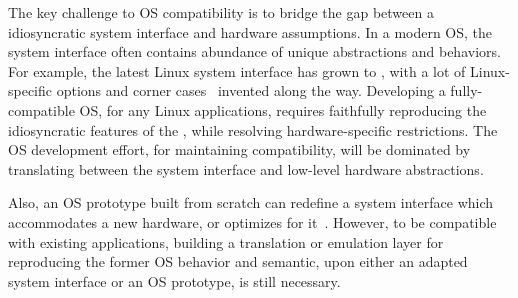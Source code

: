The key challenge to OS compatibility
is to bridge the gap between
a idiosyncratic system interface and hardware assumptions.
In a modern OS, the system interface
often contains abundance of unique abstractions and behaviors.
For example, the latest Linux system interface has grown to  \linuxapis{},
with a lot of Linux-specific options and corner cases~\cite{linux-man-syscall}
invented along the way.
Developing a fully-compatible OS, for any Linux applications, %
requires faithfully reproducing
the idiosyncratic features of the \linuxapis{},
while resolving hardware-specific restrictions.
The OS development effort, for maintaining compatibility, will be dominated by translating between the system interface
and low-level hardware abstractions.









Also, an OS prototype built from scratch
can redefine a system interface which accommodates a new hardware, or optimizes for it~\cite{baumann09barrelfish,peter14arrakis,belay14ix}.
However, to be compatible with existing applications,
building a translation or emulation layer for reproducing the former OS behavior and semantic, upon either an adapted system interface or an OS prototype, is still necessary.



